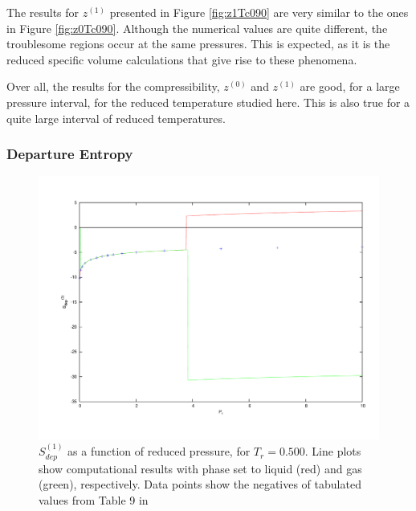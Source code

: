 \documentclass[english]{../thermomemo/thermomemo}
\numberwithin{equation}{section}
\begin{document}
The results for $z^{(1)}$ presented in Figure \ref{fig:z1Tc090} are very similar to the ones in Figure \ref{fig:z0Tc090}. Although the numerical values are quite different, the troublesome regions occur at the same pressures. This is expected, as it is the reduced specific volume calculations that give rise to these phenomena. 

Over all, the results for the compressibility, $z^{(0)}$ and $z^{(1)}$ are good, for a large pressure interval, for the reduced temperature studied here. This is also true for a quite large interval of reduced temperatures. 

\subsubsection*{Departure Entropy}
\begin{figure}
	\centering
	\includegraphics[trim = 1.5cm 2cm 0 1cm, clip = true, width=14cm]{Sdep0Tc050}
	\caption{$S_{dep}^{(1)}$ as a function of reduced pressure, for $T_r = 0.500$. Line plots show computational results with phase set to liquid (red) and gas (green), respectively. Data points show the negatives of tabulated values from Table 9 in \cite{LK}}
	\label{fig:Sdep0Tc050}
\end{figure}
\end{document}

